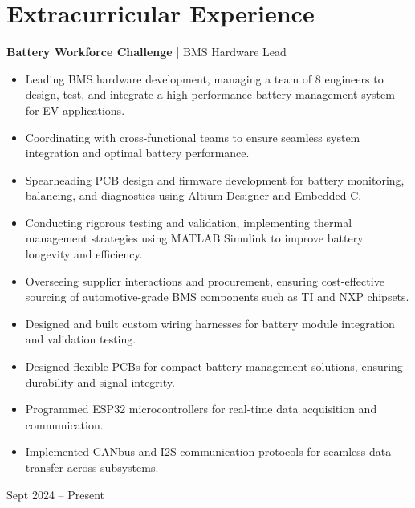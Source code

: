 \documentclass[10pt, letterpaper]{article}
\newenvironment{highlights}{
    \begin{itemize}[
        topsep=0.10 cm,
        parsep=0.10 cm,
        partopsep=0pt,
        itemsep=0pt,
        leftmargin=0.4 cm + 10pt
    ]
}{
    \end{itemize}
} %
\newenvironment{twocolentry}[2][]{
    \onecolentry
    \def\secondColumn{#2}
    \setcolumnwidth{\fill, 4.5 cm}
    \begin{paracol}{2}
}{
    \switchcolumn \raggedleft \secondColumn
    \end{paracol}
    \endonecolentry
} %
\begin{document}
        \section{Extracurricular Experience}
        \begin{twocolentry}{Sept 2024 – Present}
        \textbf{Battery Workforce Challenge} | BMS Hardware Lead
        \begin{highlights}
        \item Leading BMS hardware development, managing a team of 8 engineers to design, test, and integrate a high-performance battery management system for EV applications.
        \item Coordinating with cross-functional teams to ensure seamless system integration and optimal battery performance.
        \item Spearheading PCB design and firmware development for battery monitoring, balancing, and diagnostics using Altium Designer and Embedded C.
        \item Conducting rigorous testing and validation, implementing thermal management strategies using MATLAB Simulink to improve battery longevity and efficiency.
        \item Overseeing supplier interactions and procurement, ensuring cost-effective sourcing of automotive-grade BMS components such as TI and NXP chipsets.
        \item Designed and built custom wiring harnesses for battery module integration and validation testing.
        \item Designed flexible PCBs for compact battery management solutions, ensuring durability and signal integrity.
        \item Programmed ESP32 microcontrollers for real-time data acquisition and communication.
        \item Implemented CANbus and I2S communication protocols for seamless data transfer across subsystems.
        \end{highlights}
        \end{twocolentry}
        
        \vspace{0.2 cm} %
        
\end{document}
